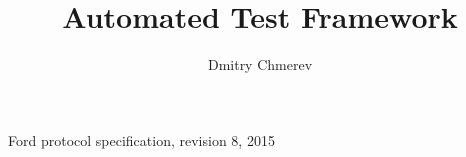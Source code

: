 \documentclass{article}
\author{Dmitry Chmerev}
\title{Automated Test Framework}
\begin{document}
\maketitle
\tableofcontents



\begin{thebibliography}{9}
  Ford protocol specification,
  revision 8,
  2015
\end{thebibliography}
\end{document}
